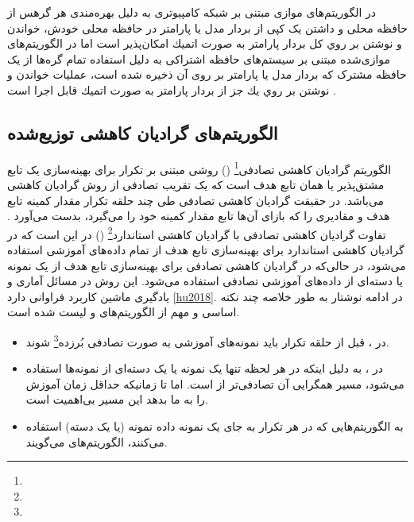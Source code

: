 در الگوریتم‌های موازی مبتنی بر شبکه کامپیوتری به دلیل بهره‌مندی هر گرهس از حافظه محلی و داشتن یک کپی از بردار مدل یا پارامتر در حافظه محلی خودش، خواندن و نوشتن بر روي كل بردار پارامتر به صورت اتميك امکان‌پذیر است اما در الگوریتم‌های موازی‌شده مبتنی بر سیستم‌های حافظه اشتراکی به دلیل استفاده تمام گره‌ها از یک حافظه مشترک که بردار مدل یا پارامتر بر روی آن ذخیره شده است، عملیات خواندن و نوشتن بر روي يك جز از بردار پارامتر به صورت اتميك قابل اجرا است \cite{GerBook}.
\subsection{الگوریتم‌های گرادیان کاهشی توزیع‌شده}

الگوریتم گرادیان کاهشی تصادفی\footnote{} () روشی مبتنی بر تکرار برای بهینه‌سازی یک تابع مشتق‌پذیر یا همان تابع هدف است که یک تقریب تصادفی از روش گرادیان کاهشی می‌باشد. در حقیقت گرادیان کاهشی تصادفی طی چند حلقه تکرار مقدار کمینه تابع هدف و مقادیری را که بازای آن‌ها تابع مقدار کمینه خود را می‌گیرد، بدست می‌آورد \cite{Zha2004}. تفاوت گرادیان کاهشی تصادفی با گرادیان کاهشی استاندارد\footnote{} () در این است که در گرادیان کاهشی استاندارد برای بهینه‌سازی تابع هدف از تمام داده‌های آموزشی استفاده می‌شود، در حالی‌که در گرادیان کاهشی تصادفی برای بهینه‌سازی تابع هدف از یک نمونه یا دسته‌ای از داده‌های آموزشی تصادفی استفاده می‌شود. این روش در مسائل آماری و یادگیری ماشین کاربرد فراوانی دارد \ref{hu2018}. در ادامه نوشتار به طور خلاصه چند نکته اساسی و مهم از الگوریتم‌های  و  لیست شده است.

\begin{itemize}
	\item 
	در ، قبل از حلقه تکرار باید نمونه‌های آموزشی به صورت تصادفی بُرزده\footnote{} شوند.
	\item 
	در ، به دلیل اینکه در هر لحظه تنها یک نمونه یا یک دسته‌ای از نمونه‌ها استفاده می‌شود، مسیر همگرایی آن تصادفی‌تر از  است. اما تا زمانیکه حداقل زمان آموزش را به ما بدهد این مسیر بی‌اهمیت است.
	\item 
	به الگوریتم‌هایی که در هر تکرار به جای یک نمونه داده  نمونه (یا یک دسته) استفاده می‌کنند، الگوریتم‌های   می‌گویند.
\end{itemize}	


